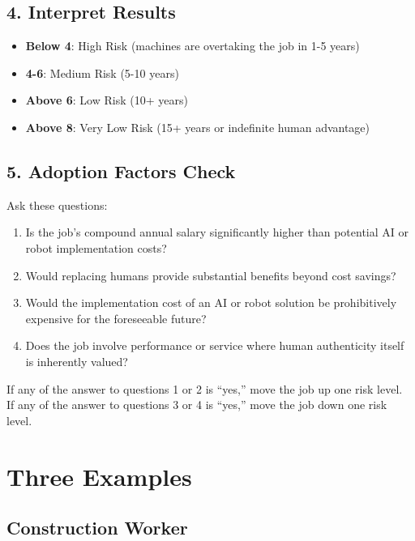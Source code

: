 \documentclass[
  11pt,
]{article}
\providecommand{\tightlist}{%
  \setlength{\itemsep}{0pt}\setlength{\parskip}{0pt}}
\begin{document}
\subsection{4. Interpret Results}\label{interpret-results}

\begin{itemize}
\tightlist
\item
  \textbf{Below 4}: High Risk (machines are overtaking the job in 1-5
  years)
\item
  \textbf{4-6}: Medium Risk (5-10 years)
\item
  \textbf{Above 6}: Low Risk (10+ years)
\item
  \textbf{Above 8}: Very Low Risk (15+ years or indefinite human
  advantage)
\end{itemize}

\subsection{5. Adoption Factors Check}\label{adoption-factors-check}

Ask these questions:

\begin{enumerate}
\def\labelenumi{\arabic{enumi}.}
\tightlist
\item
  Is the job's compound annual salary significantly higher than
  potential AI or robot implementation costs?
\item
  Would replacing humans provide substantial benefits beyond cost
  savings?
\item
  Would the implementation cost of an AI or robot solution be
  prohibitively expensive for the foreseeable future?
\item
  Does the job involve performance or service where human authenticity
  itself is inherently valued?
\end{enumerate}

If any of the answer to questions 1 or 2 is ``yes,'' move the job up one
risk level.\\
If any of the answer to questions 3 or 4 is ``yes,'' move the job down
one risk level.

\section{Three Examples}\label{three-examples}

\subsection{Construction Worker}\label{construction-worker}
\end{document}
